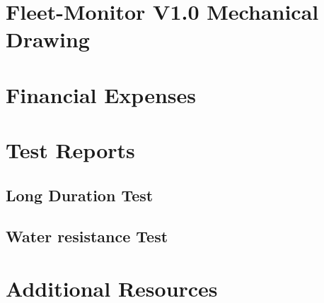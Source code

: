 \section{Fleet-Monitor V1.0 Mechanical Drawing} \label{Fleet-Monitor V1.0 Mechanical Drawing}
\enlargethispage{2.5cm}
\begin{adjustwidth}{0.23cm}{0cm} \hfuzz=7.0pt
\end{adjustwidth}
\newpage


\section{Financial Expenses} \label{Financial Expenses}
\pagebreak

\section{Test Reports} \label{Test Reports}
\pagebreak

\subsection{Long Duration Test} \label{Long Duration Test}
\pagebreak

\subsection{Water resistance Test} \label{Water resistance Test}
\pagebreak

\section{Additional Resources} \label{Additional Resources}
\pagebreak
